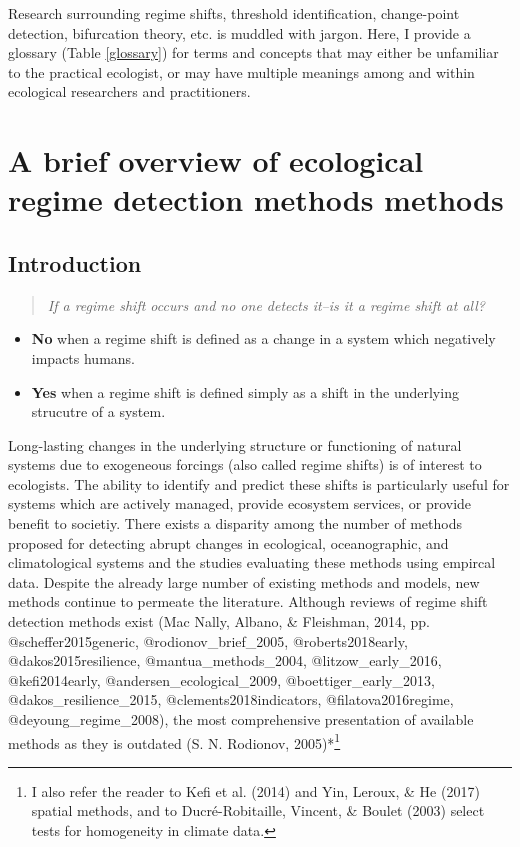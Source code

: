 \documentclass[12pt,twoside,openany]{reedthesis}
\providecommand{\tightlist}{%
  \setlength{\itemsep}{0pt}\setlength{\parskip}{0pt}}
\begin{document}
Research surrounding regime shifts, threshold identification, change-point detection, bifurcation theory, etc. is muddled with jargon. Here, I provide a glossary (Table \ref{glossary}) for terms and concepts that may either be unfamiliar to the practical ecologist, or may have multiple meanings among and within ecological researchers and practitioners.

\hypertarget{rdmReview}{%
\chapter{A brief overview of ecological regime detection methods methods}\label{rdmReview}}

\hypertarget{introduction}{%
\section{Introduction}\label{introduction}}
\begin{quote}
\emph{If a regime shift occurs and no one detects it--is it a regime shift at all?}
\end{quote}
\begin{itemize}
\tightlist
\item
  \textbf{No} when a regime shift is defined as a change in a system which negatively impacts humans.
\item
  \textbf{Yes} when a regime shift is defined simply as a shift in the underlying strucutre of a system.
\end{itemize}
Long-lasting changes in the underlying structure or functioning of natural systems due to exogeneous forcings (also called regime shifts) is of interest to ecologists. The ability to identify and predict these shifts is particularly useful for systems which are actively managed, provide ecosystem services, or provide benefit to societiy. There exists a disparity among the number of methods proposed for detecting abrupt changes in ecological, oceanographic, and climatological systems and the studies evaluating these methods using empircal data. Despite the already large number of existing methods and models, new methods continue to permeate the literature. Although reviews of regime shift detection methods exist (Mac Nally, Albano, \& Fleishman, 2014, pp. @scheffer2015generic, @rodionov\_brief\_2005, @roberts2018early, @dakos2015resilience, @mantua\_methods\_2004, @litzow\_early\_2016, @kefi2014early, @andersen\_ecological\_2009, @boettiger\_early\_2013, @dakos\_resilience\_2015, @clements2018indicators, @filatova2016regime, @deyoung\_regime\_2008), the most comprehensive presentation of available methods as they is outdated (S. N. Rodionov, 2005)*\footnote{I also refer the reader to Kefi et al. (2014) and Yin, Leroux, \& He (2017) spatial methods, and to Ducré-Robitaille, Vincent, \& Boulet (2003) select tests for homogeneity in climate data.}
\end{document}

